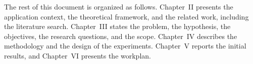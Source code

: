 The rest of this document is organized as follows. Chapter~II presents the application context, the theoretical framework, and the related work, including the literature search. Chapter~III states the problem, the hypothesis, the objectives, the research questions, and the scope. Chapter~IV describes the methodology and the design of the experiments. Chapter~V reports the initial results, and Chapter~VI presents the workplan.

